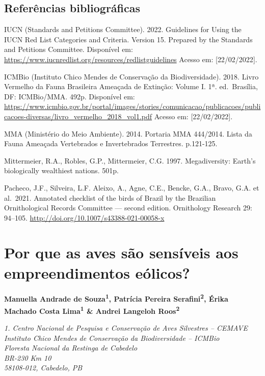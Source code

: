 \documentclass[
  oneside]{scrbook}
\begin{document}
\newpage

\hypertarget{referuxeancias-bibliogruxe1ficas-2}{%
\section{Referências bibliográficas}\label{referuxeancias-bibliogruxe1ficas-2}}

IUCN (Standards and Petitions Committee). 2022. Guidelines for Using the IUCN Red List Categories and Criteria. Version 15. Prepared by the Standards and Petitions Committee. Disponível em: \url{https://www.iucnredlist.org/resources/redlistguidelines} Acesso em: {[}22/02/2022{]}.

ICMBio (Instituto Chico Mendes de Conservação da Biodiversidade). 2018. Livro Vermelho da Fauna Brasileira Ameaçada de Extinção: Volume I. 1ª. ed.~Brasília, DF: ICMBio/MMA. 492p. Disponível em: \url{https://www.icmbio.gov.br/portal/images/stories/comunicacao/publicacoes/publicacoes-diversas/livro_vermelho_2018_vol1.pdf} Acesso em: {[}22/02/2022{]}.

MMA (Ministério do Meio Ambiente). 2014. Portaria MMA 444/2014. Lista da Fauna Ameaçada Vertebrados e Invertebrados Terrestres. p.121-125.

Mittermeier, R.A., Robles, G.P., Mittermeier, C.G. 1997. Megadiversity: Earth's biologically wealthiest nations. 501p.

Pacheco, J.F., Silveira, L.F. Aleixo, A., Agne, C.E., Bencke, G.A., Bravo, G.A. et al.~2021. Annotated checklist of the birds of Brazil by the Brazilian Ornithological Records Committee --- second edition. Ornithology Research 29: 94--105. \url{http://doi.org/10.1007/s43388-021-00058-x}

\hypertarget{cap4}{%
\chapter{Por que as aves são sensíveis aos empreendimentos eólicos?}\label{cap4}}

\pagestyle{headings}

\textbf{Manuella Andrade de Souza\textsuperscript{1}, Patrícia Pereira Serafini\textsuperscript{2}, Érika Machado Costa Lima\textsuperscript{1} \& Andrei Langeloh Roos\textsuperscript{2}}

\emph{1. Centro Nacional de Pesquisa e Conservação de Aves Silvestres -- CEMAVE}\\
\emph{Instituto Chico Mendes de Conservação da Biodiversidade -- ICMBio}\\
\emph{Floresta Nacional da Restinga de Cabedelo}\\
\emph{BR-230 Km 10}\\
\emph{58108-012, Cabedelo, PB}
\end{document}
